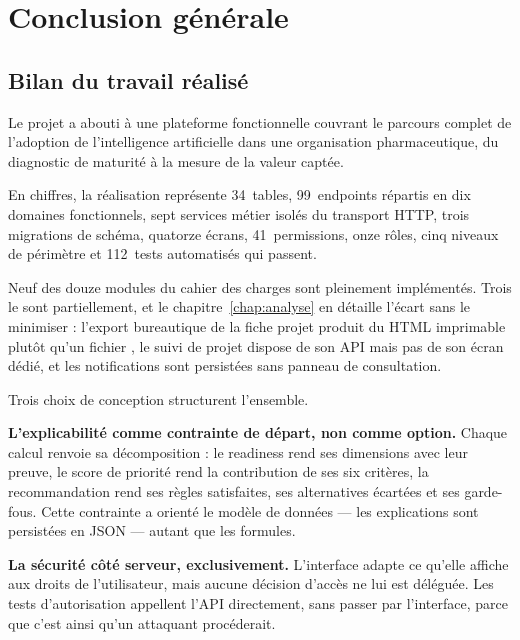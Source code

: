 \chapter*{Conclusion générale}
\label{chap:conclusion}

\section*{Bilan du travail réalisé}

Le projet a abouti à une plateforme fonctionnelle couvrant le parcours complet de
l'adoption de l'intelligence artificielle dans une organisation pharmaceutique, du
diagnostic de maturité à la mesure de la valeur captée.

En chiffres, la réalisation représente 34~tables, 99~endpoints répartis en dix domaines
fonctionnels, sept services métier isolés du transport HTTP, trois migrations de schéma,
quatorze écrans, 41~permissions, onze rôles, cinq niveaux de périmètre et 112~tests
automatisés qui passent.

Neuf des douze modules du cahier des charges sont pleinement implémentés. Trois le sont
partiellement, et le chapitre~\ref{chap:analyse} en détaille l'écart sans le minimiser :
l'export bureautique de la fiche projet produit du HTML imprimable plutôt qu'un fichier
, le suivi de projet dispose de son API mais pas de son écran dédié, et les
notifications sont persistées sans panneau de consultation.

Trois choix de conception structurent l'ensemble.

\textbf{L'explicabilité comme contrainte de départ, non comme option.} Chaque calcul
renvoie sa décomposition : le readiness rend ses dimensions avec leur preuve, le score
de priorité rend la contribution de ses six critères, la recommandation rend ses règles
satisfaites, ses alternatives écartées et ses garde-fous. Cette contrainte a orienté le
modèle de données — les explications sont persistées en JSON — autant que les formules.

\textbf{La sécurité côté serveur, exclusivement.} L'interface adapte ce qu'elle affiche
aux droits de l'utilisateur, mais aucune décision d'accès ne lui est déléguée. Les
tests d'autorisation appellent l'API directement, sans passer par l'interface, parce que
c'est ainsi qu'un attaquant procéderait.

